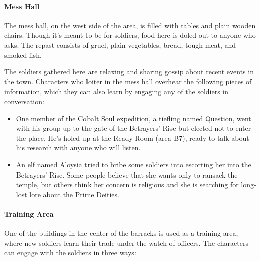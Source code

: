 \documentclass[10pt,a4paper,twoside,twocolumn,openany,nodeprecatedcode]{dndbook}
\begin{document}
\paragraph{Mess Hall}
The mess hall, on the west side of the area, is filled with tables and plain wooden chairs. Though it's meant to be for soldiers, food here is doled out to anyone who asks. The repast consists of gruel, plain vegetables, bread, tough meat, and smoked fish.

The soldiers gathered here are relaxing and sharing gossip about recent events in the town. Characters who loiter in the mess hall overhear the following pieces of information, which they can also learn by engaging any of the soldiers in conversation:


\begin{itemize}
\item One member of the Cobalt Soul expedition, a tiefling named Question, went with his group up to the gate of the Betrayers' Rise but elected not to enter the place. He's holed up at the Ready Room (area B7), ready to talk about his research with anyone who will listen.
\item An elf named Aloysia tried to bribe some soldiers into escorting her into the Betrayers' Rise. Some people believe that she wants only to ransack the temple, but others think her concern is religious and she is searching for long-lost lore about the Prime Deities.
\end{itemize}

\paragraph{Training Area}
One of the buildings in the center of the barracks is used as a training area, where new soldiers learn their trade under the watch of officers. The characters can engage with the soldiers in three ways:
\end{document}

